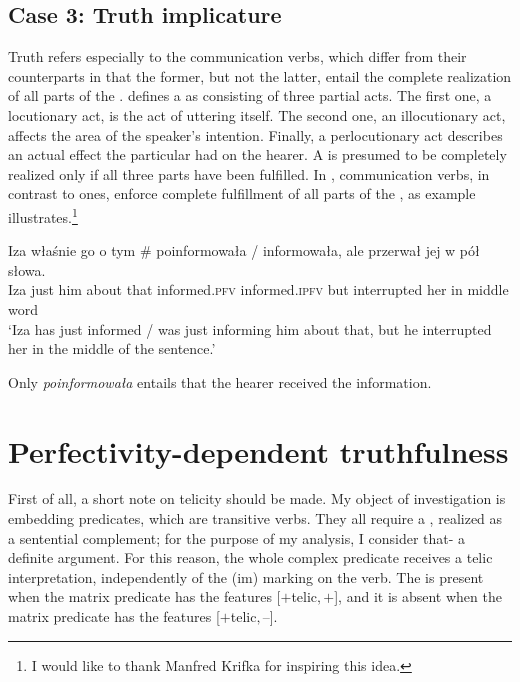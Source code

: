 \documentclass[output=paper,  modfonts,  newtxmath,  hidelinks		  ]{langscibook}
\begin{document}
\largerpage[-1]
\subsection{Case 3: {T}ruth implicature}\label{21:trimpl}
Truth  refers especially to the  communication verbs, which differ from their  counterparts in that the former, but not the latter, entail the complete realization of all parts of the . \cite{Austin1962} defines a  as consisting of three partial acts. The first one, a locutionary act, is the act of uttering itself. The second one, an illocutionary act, affects the area of the speaker’s intention. Finally, a perlocutionary act describes an actual effect the particular  had on the hearer. A  is presumed to be completely realized only if all three parts have been fulfilled. In ,  communication verbs, in contrast to  ones, enforce complete fulfillment of all parts of the , as example  illustrates.\footnote{I would like to thank Manfred Krifka for inspiring this idea.}

\ea\label{21:sp}
\gll Iza właśnie go o tym {\#}\hspace{-2pt} poinformowała / informowała, ale przerwał jej w pół słowa.\\
Iza just him about that {} informed.\textsc{pfv} {} informed.\textsc{ipfv} but interrupted her in middle word\\
\glt	`Iza has just informed / was just informing him about that, but he interrupted her in the middle of the sentence.'
\z

\noindent Only \textit{poinformowała} entails that the hearer received the information.\par


\section{Perfectivity-dependent truthfulness}\label{21:perfdep}

First of all, a short note on telicity should be made. My object of investigation is embedding predicates, which are transitive verbs. They all require a , realized as a sentential complement; for the purpose of my analysis, I consider that- a definite argument. For this reason, the whole complex predicate receives a telic interpretation, independently of the (im) marking on the verb. The  is present when the matrix predicate has the features [$+$telic$, +{}$], and it is absent when the matrix predicate has the features [$+$telic$,–{}$].
\end{document}
